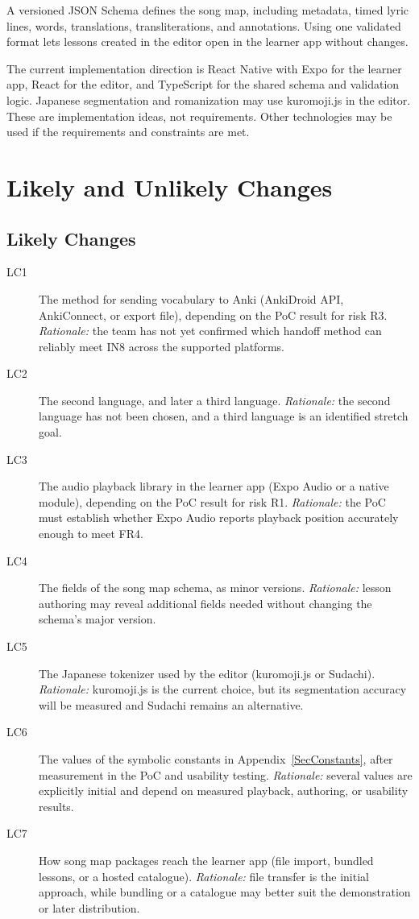 \documentclass[12pt]{article}
\begin{document}
A versioned JSON Schema defines the song map, including metadata, timed lyric
lines, words, translations, transliterations, and annotations. Using one
validated format lets lessons created in the editor open in the learner app
without changes.

The current implementation direction is React Native with Expo for the learner
app, React for the editor, and TypeScript for the shared schema and validation
logic. Japanese segmentation and romanization may use kuromoji.js in the
editor. These are implementation ideas, not requirements. Other technologies
may be used if the requirements and constraints are met.

\section{Likely and Unlikely Changes} \label{SecChanges}
\subsection{Likely Changes}
\begin{description}
\item[LC1] The method for sending vocabulary to Anki (AnkiDroid API,
AnkiConnect, or export file), depending on the PoC result for risk R3.
\emph{Rationale:} the team has not yet confirmed which handoff method can
reliably meet IN8 across the supported platforms.
\item[LC2] The second language, and later a third language.
\emph{Rationale:} the second language has not been chosen, and a third language
is an identified stretch goal.
\item[LC3] The audio playback library in the learner app (Expo Audio or a
native module), depending on the PoC result for risk R1.
\emph{Rationale:} the PoC must establish whether Expo Audio reports playback
position accurately enough to meet FR4.
\item[LC4] The fields of the song map schema, as minor versions.
\emph{Rationale:} lesson authoring may reveal additional fields needed without
changing the schema's major version.
\item[LC5] The Japanese tokenizer used by the editor (kuromoji.js or
Sudachi).
\emph{Rationale:} kuromoji.js is the current choice, but its segmentation
accuracy will be measured and Sudachi remains an alternative.
\item[LC6] The values of the symbolic constants in
Appendix~\ref{SecConstants}, after measurement in the PoC and usability
testing.
\emph{Rationale:} several values are explicitly initial and depend on measured
playback, authoring, or usability results.
\item[LC7] How song map packages reach the learner app (file import, bundled
lessons, or a hosted catalogue).
\emph{Rationale:} file transfer is the initial approach, while bundling or a
catalogue may better suit the demonstration or later distribution.
\end{description}
\end{document}
